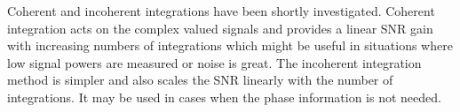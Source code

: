 Coherent and incoherent integrations have been shortly investigated. Coherent integration acts on the complex valued signals and provides a linear SNR gain with increasing numbers of integrations which might be useful in situations where low signal powers are measured or noise is great. The incoherent integration method is simpler and also scales the SNR linearly with the number of integrations. It may be used in cases when the phase information is not needed.
